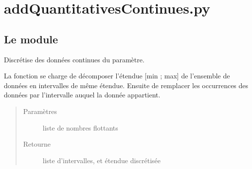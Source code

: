\documentclass[letterpaper,10pt,french]{sphinxmanual}
\begin{document}
\chapter{addQuantitativesContinues.py}
\label{\detokenize{addQuantitativesContinues:addquantitativescontinues-py}}\label{\detokenize{addQuantitativesContinues:module-add.addQuantitativesContinues}}\label{\detokenize{addQuantitativesContinues::doc}}

\section{Le module }
\label{\detokenize{addQuantitativesContinues:le-module-analyse-de-donnees-quantitatives-continues}}

\begin{fulllineitems}
\label{\detokenize{addQuantitativesContinues:add.addQuantitativesContinues.discretisation}}
Discrétise des données continues du paramètre.

La fonction se charge de décomposer l’étendue {[}min ; max{]} de l’ensemble de données en  intervalles de même étendue.
Ensuite de remplacer les occurrences des données par l’intervalle auquel la donnée appartient.
\begin{quote}\begin{description}
\item[{Paramètres}] \leavevmode
{} \textendash{} liste de nombres flottants

\item[{Retourne}] \leavevmode
liste d’intervalles, et étendue discrétisée

\end{description}\end{quote}

\end{fulllineitems}

\end{document}
